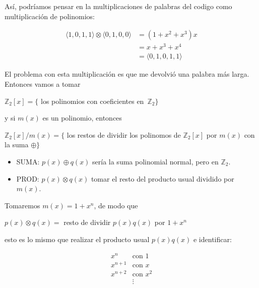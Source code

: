 \documentclass[10pt,a4paper]{article}
\begin{document}
Así, podríamos pensar en la multiplicaciones de palabras del codigo como multiplicación de polinomios:

\begin{center}
\begin{align*} \langle 1, 0, 1, 1\rangle \otimes \langle0, 1, 0, 0\rangle &=(1 + x^2 + x^3) x\\ &= x + x^3 + x^4\\ &= \langle 0, 1, 0, 1, 1\rangle \end{align*}
\end{center}

El problema con esta multiplicación es que me devolvió una palabra más larga. Entonces vamos a tomar

\begin{center}
$\mathbb{Z}_2\left[x\right] = \{$ los polinomios con coeficientes en $\mathbb{Z}_2\}$
\end{center}

y si $m(x)$ es un polinomio, entonces

\begin{center}
$\mathbb{Z}_2\left[x\right]/m(x) =\{$ los restos de dividir los polinomos de $\mathbb{Z}_2\left[ x \right]$ por $m(x)$ con la suma $\oplus\}$
\end{center}

\begin{itemize}

	\item SUMA: $p(x) \oplus q(x)$ sería la suma polinomial normal, pero en $\mathbb{Z}_2$.
	\item PROD: $p(x)\otimes q(x)$ tomar el resto del producto usual dividido por $m(x)$.
\end{itemize}

Tomaremos $m(x) = 1+ x^n$, de modo que

\begin{center}
$p(x) \otimes q(x) = $ resto de dividir $p(x)q(x)$ por $1 + x^n$
\end{center}

esto es lo mismo que realizar el producto usual $p(x)q(x)$ e identificar:

\begin{center}
\begin{align*} x^n &\text{con } 1\\ x^{n+1} & \text{con } x\\ x^{n+ 2} & \text{con } x^2\\ &\vdots \end{align*}
\end{center}
\end{document}
